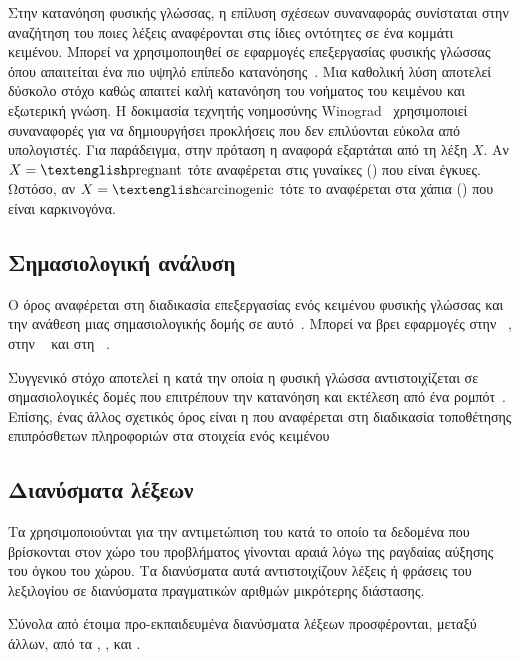 Στην κατανόηση φυσικής γλώσσας, η επίλυση σχέσεων συναναφοράς συνίσταται στην αναζήτηση του ποιες λέξεις αναφέρονται στις ίδιες οντότητες σε ένα κομμάτι κειμένου.
Μπορεί να χρησιμοποιηθεί σε εφαρμογές επεξεργασίας φυσικής γλώσσας όπου απαιτείται ένα πιο υψηλό επίπεδο κατανόησης~\cite{peng2015solving}.
Μια καθολική λύση αποτελεί δύσκολο στόχο καθώς απαιτεί καλή κατανόηση του νοήματος του κειμένου και εξωτερική γνώση.
Η δοκιμασία τεχνητής νοημοσύνης Winograd~\cite{levesque2012winograd} χρησιμοποιεί συναναφορές για να δημιουργήσει προκλήσεις που δεν επιλύονται εύκολα από υπολογιστές.
Για παράδειγμα, στην πρόταση  η αναφορά  εξαρτάται από τη λέξη $X$.
Αν $X = \text{\en{pregnant}}$ τότε αναφέρεται στις γυναίκες () που είναι έγκυες.
Ωστόσο, αν $X = \text{\en{carcinogenic}}$ τότε το  αναφέρεται στα χάπια () που είναι καρκινογόνα.

\subsection{Σημασιολογική ανάλυση}
Ο όρος  αναφέρεται στη διαδικασία επεξεργασίας ενός κειμένου φυσικής γλώσσας και την ανάθεση μιας σημασιολογικής δομής σε αυτό~\cite{martin2009speech}.
Μπορεί να βρει εφαρμογές
στην ~\cite{berant2013semantic},
στην ~\cite{rabinovich2017abstract,yin2017syntactic}
και στη ~\cite{andreas2013semantic}.

Συγγενικό στόχο αποτελεί η  κατά την οποία η φυσική γλώσσα αντιστοιχίζεται σε σημασιολογικές δομές που επιτρέπουν την κατανόηση και εκτέλεση από ένα ρομπότ~\cite{matuszek2013learning}.
Επίσης, ένας άλλος σχετικός όρος είναι η  που αναφέρεται στη διαδικασία τοποθέτησης επιπρόσθετων πληροφοριών στα στοιχεία ενός κειμένου

\subsection{Διανύσματα λέξεων}
Τα  χρησιμοποιούνται για την αντιμετώπιση του  κατά το οποίο τα δεδομένα που βρίσκονται στον χώρο του προβλήματος γίνονται αραιά λόγω της ραγδαίας αύξησης του όγκου του χώρου.
Τα διανύσματα αυτά αντιστοιχίζουν λέξεις ή φράσεις του λεξιλογίου σε διανύσματα πραγματικών αριθμών μικρότερης διάστασης.

Σύνολα από έτοιμα προ-εκπαιδευμένα διανύσματα λέξεων προσφέρονται, μεταξύ άλλων, από τα , ,  και .

